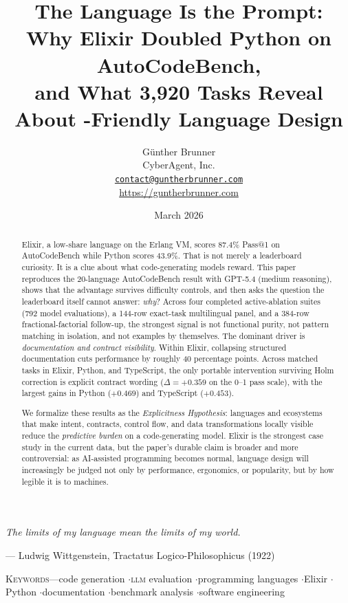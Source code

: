 \documentclass[11pt]{article}
\title{\vspace{-1.1em}\bfseries\LARGE
  The Language Is the Prompt:\\[0.35em]
  \Large Why Elixir Doubled Python on AutoCodeBench,\\
  and What 3{,}920 Tasks Reveal About \acro{LLM}-Friendly Language Design}
\author{G{\"u}nther Brunner\\
CyberAgent, Inc.\\[0.3em]
\small\texttt{\href{mailto:contact@guntherbrunner.com}{contact@guntherbrunner.com}}\\
\small\url{https://guntherbrunner.com}}
\date{March 2026}
\makeatletter
\newcommand{\acb}{AutoCodeBench}
\newcommand{\passatone}{Pass@1}
\newcommand{\elixir}{Elixir}
\newcommand{\pythonlang}{Python}
\newcommand{\tslang}{TypeScript}
\newcommand{\acro}[1]{\textsc{\MakeLowercase{#1}}}
\makeatother
\begin{document}
\maketitle
\vspace{-1.0em}

\epigraph{\itshape The limits of my language mean the limits of my world.}{--- Ludwig Wittgenstein, \textup{Tractatus Logico-Philosophicus} (1922)}

\vspace{-0.8em}

\begin{abstract}
\elixir{}, a low-share language on the Erlang VM, scores 87.4\% \passatone{} on \acb{} while \pythonlang{} scores 43.9\%. That is not merely a leaderboard curiosity. It is a clue about what code-generating models reward. This paper reproduces the 20-language \acb{} result with GPT-5.4 (medium reasoning), shows that the advantage survives difficulty controls, and then asks the question the leaderboard itself cannot answer: \emph{why}? Across four completed active-ablation suites (792 model evaluations), a 144-row exact-task multilingual panel, and a 384-row fractional-factorial follow-up, the strongest signal is not functional purity, not pattern matching in isolation, and not examples by themselves. The dominant driver is \emph{documentation and contract visibility}. Within \elixir{}, collapsing structured documentation cuts performance by roughly 40 percentage points. Across matched tasks in \elixir{}, \pythonlang{}, and \tslang{}, the only portable intervention surviving Holm correction is explicit contract wording ($\Delta = +0.359$ on the 0--1 pass scale), with the largest gains in \pythonlang{} ($+0.469$) and \tslang{} ($+0.453$).

We formalize these results as the \emph{Explicitness Hypothesis}: languages and ecosystems that make intent, contracts, control flow, and data transformations locally visible reduce the \emph{predictive burden} on a code-generating model. \elixir{} is the strongest case study in the current data, but the paper's durable claim is broader and more controversial: as AI-assisted programming becomes normal, language design will increasingly be judged not only by performance, ergonomics, or popularity, but by how legible it is to machines.
\end{abstract}

\vspace{0.5em}
{\small\textsc{Keywords}\enspace---\enspace code generation \enspace$\cdot$\enspace \acro{LLM} evaluation \enspace$\cdot$\enspace programming languages \enspace$\cdot$\enspace \elixir{} \enspace$\cdot$\enspace \pythonlang{} \enspace$\cdot$\enspace documentation \enspace$\cdot$\enspace benchmark analysis \enspace$\cdot$\enspace software engineering}
\end{document}
